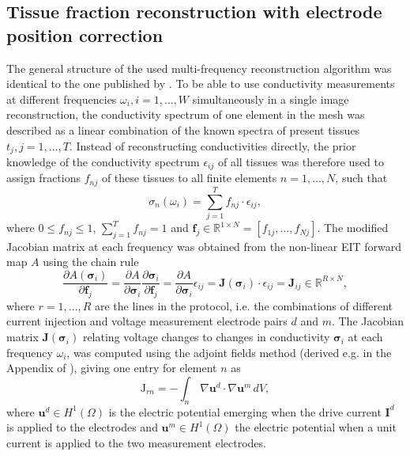 \subsection{Tissue fraction reconstruction with electrode position correction}

The general structure of the used multi-frequency reconstruction algorithm was identical to the one published by \citet{Malone2013}. To be able to use conductivity measurements at different frequencies $\omega_i, i=1,\dots,W$ simultaneously in a single image reconstruction, the conductivity spectrum of one element in the mesh was described as a linear combination of the known spectra of present tissues $t_j, j=1,\dots,T$. Instead of reconstructing conductivities directly, the prior knowledge of the conductivity spectrum $\epsilon_{ij}$ of all tissues was therefore used to assign fractions $f_{nj}$ of these tissues to all finite elements $n=1,\dots,N$, such that
\begin{equation}
\sigma_n\left(\omega_i\right) = \sum_{j=1}^T f_{nj} \cdot \epsilon_{ij},
\end{equation}
where $0 \leq f_{nj} \leq 1$, $\sum_{j=1}^T f_{nj} = 1$ and $\boldsymbol{f}_j \in \mathbb{R}^{1 \times N} = [f_{1j},\dots,f_{Nj}]$. The modified Jacobian matrix at each frequency was obtained from the non-linear EIT forward map $A$ using the chain rule
\begin{equation}
\frac{\partial A(\boldsymbol{\sigma}_i)}{\partial \boldsymbol{f}_j} = \frac{\partial A}{\partial \boldsymbol{\sigma}_i}\frac{\partial \boldsymbol{\sigma}_i}{\partial \boldsymbol{f}_j} = \frac{\partial A}{\partial \boldsymbol{\sigma}_i} \epsilon_{ij} = \mathbf{J}(\boldsymbol{\sigma}_i) \cdot \epsilon_{ij} = \mathbf{J}_{ij} \in \mathbb{R}^{R \times N},
\end{equation}
where $r = 1,\dots,R$ are the lines in the protocol, i.e. the combinations of different current injection and voltage measurement electrode pairs $d$ and $m$. The Jacobian matrix $\mathbf{J}(\boldsymbol{\sigma}_i)$ relating voltage changes to changes in conductivity $\boldsymbol{\sigma}_i$ at each frequency $\omega_i$, was computed using the adjoint fields method (derived e.g. in the Appendix of \citet{Polydorides2002}), giving one entry for element $n$ as
\begin{equation}
\label{adjoint_field}
\mathrm{J}_{rn} = - \int_{n} \, \nabla \boldsymbol{u}^d \cdot \nabla \boldsymbol{u}^m \, dV,
\end{equation}
where $\boldsymbol{u}^d \in H^1(\Omega)$ is the electric potential emerging when the drive current $\boldsymbol{I}^d$ is applied to the electrodes and $\boldsymbol{u}^m \in H^1(\Omega)$ the electric potential when a unit current is applied to the two measurement electrodes.

